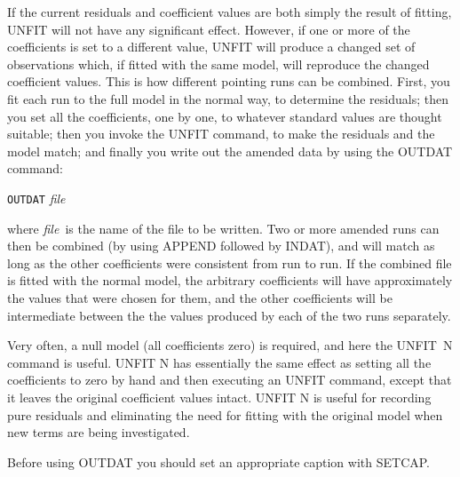 If the current residuals and coefficient values are both
simply the result of fitting, UNFIT will not have any
significant effect.  However, if one or more of the
coefficients is set to a different value, UNFIT will
produce a changed set of observations which, if
fitted with the same model, will reproduce the changed
coefficient values.  This is how
different pointing runs can be combined.
First, you fit each run to the full model in the normal way,
to determine the residuals;  then
you set all the coefficients, one by one, to whatever
standard values are thought suitable;  then you
invoke the UNFIT command, to make the residuals and the
model match;  and finally you write out
the amended data by using the OUTDAT command:
\begin{cmnds}
\> \> {\tt OUTDAT} {\it file}
\end{cmnds}
where {\it file}\, is the name of the file to be written.
Two or more
amended runs can then be combined (by using APPEND
followed by INDAT), and will match
as long as the other coefficients were consistent
from run to run.  If the combined file is fitted with
the normal model, the arbitrary coefficients will have
approximately the values that were chosen for them, and
the other coefficients will be intermediate between the
the values produced by each of the two runs separately.

Very often, a null model (all coefficients zero) is required,
and here the UNFIT~N command is useful.
UNFIT N has essentially the
same effect as setting all the coefficients to zero by
hand and then executing an UNFIT command, except that it leaves
the original coefficient values intact.  UNFIT N is
useful for recording pure residuals and eliminating the
need for fitting with the original model when new
terms are being investigated.

Before using OUTDAT you should set an appropriate
caption with SETCAP.

